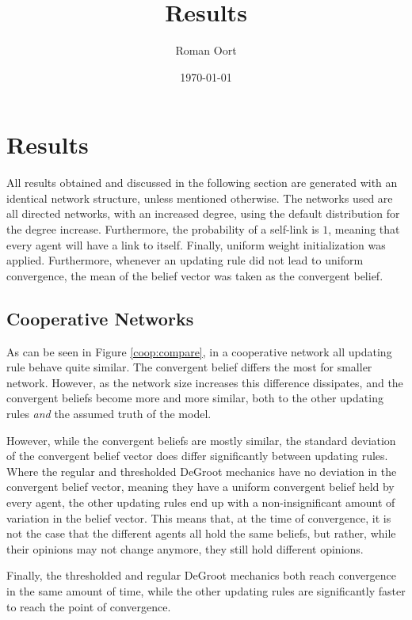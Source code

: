 \documentclass{article}
\title{Results}
\author{Roman Oort}
\date{\today}
\begin{document}
\maketitle

\tableofcontents
\newpage
\section{Results}

All results obtained and discussed in the following section are generated with an identical network structure, unless mentioned otherwise. The networks used are all directed networks, with an increased degree, using the default distribution for the degree increase. Furthermore, the probability of a self-link is $1$, meaning that every agent will have a link to itself. Finally, uniform weight initialization was applied. Furthermore, whenever an updating rule did not lead to uniform convergence, the mean of the belief vector was taken as the convergent belief.

\newpage

\subsection{Cooperative Networks}

As can be seen in Figure \ref{coop:compare}, in a cooperative network all updating rule behave quite similar. The convergent belief differs the most for smaller network. However, as the network size increases this difference dissipates, and the convergent beliefs become more and more similar, both to the other updating rules \emph{and} the assumed truth of the model.

\noindent However, while the convergent beliefs are mostly similar, the standard deviation of the convergent belief vector does differ significantly between updating rules. Where the regular and thresholded DeGroot mechanics have no deviation in the convergent belief vector, meaning they have a uniform convergent belief held by every agent, the other updating rules end up with a non-insignificant amount of variation in the belief vector. This means that, at the time of convergence, it is not the case that the different agents all hold the same beliefs, but rather, while their opinions may not change anymore, they still hold different opinions. 

\noindent Finally, the thresholded and regular DeGroot mechanics both reach convergence in the same amount of time, while the other updating rules are significantly faster to reach the point of convergence.
\end{document}
